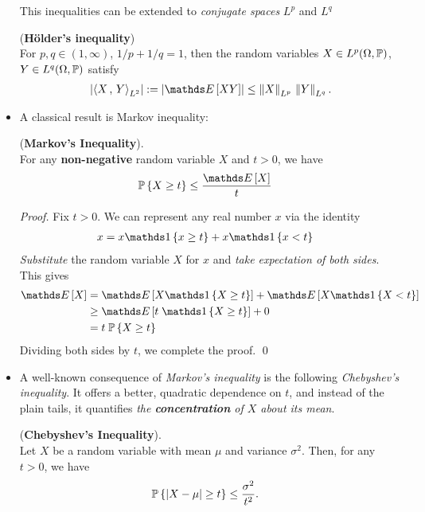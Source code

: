 \documentclass[11pt]{article}
\begin{document}
\begin{itemize}
This inequalities can be extended to \emph{conjugate spaces} $L^p$ and $L^q$ 
 \begin{proposition} (\textbf{H\"older's inequality}) \citep{vershynin2018high}\\
For $p,q \in (1, \infty)$, $1/p + 1/q = 1$, then the random variables $X \in L^p(\Omega, {\mathbb P})$, $Y \in L^q(\Omega, {\mathbb P})$ satisfy
\begin{align}
\abs{\inn{X}{Y}_{L^2}} := \abs{\E{}{XY}}  \le \norm{X}{L^p} \, \norm{Y}{L^q}. \label{ineqn: holder_inequality}
\end{align}
\end{proposition}

\item A classical result is Markov inequality:
\begin{proposition} (\textbf{Markov's Inequality}). \citep{vershynin2018high}\\
For any \textbf{non-negative} random variable $X$ and $t > 0$, we have
\begin{align}
\bP\set{X \ge t} &\le \frac{\E{}{X}}{t} \label{ineqn: markov_inequality}
\end{align}
\end{proposition}
\begin{proof}
Fix $t > 0$. We can represent any real number $x$ via the identity
\begin{align*}
x &= x\ind{x \ge t} + x\ind{x < t}
\end{align*}
\emph{Substitute} the random variable $X$ for $x$ and \emph{take expectation of both sides}. This
gives
\begin{align*}
\E{}{X} &= \E{}{X\ind{X \ge t}} + \E{}{X\ind{X < t}} \\
& \ge \E{}{t \;\ind{X \ge t}} + 0 \\
& = t\; \bP\set{X \ge t}
\end{align*}
Dividing both sides by $t$, we complete the proof. \qed
\end{proof}

\item A well-known consequence of \emph{Markov's inequality} is the following \emph{Chebyshev's inequality}. It offers a better, quadratic dependence on $t$, and instead of the plain tails, it quantifies \emph{the \textbf{concentration} of $X$ about its mean}.
\begin{proposition} (\textbf{Chebyshev's Inequality}). \citep{vershynin2018high}\\
Let $X$ be a random variable with mean $\mu$ and variance $\sigma^2$. Then, for any $t > 0$, we have
\begin{align}
{\mathbb P}\left\{\left\lvert X - \mu \right\rvert \ge t\right\} &\le \frac{\sigma^2}{t^2}. \label{ineqn: chebyshev_inequality}
\end{align}
\end{proposition}


\end{itemize}
\end{document}
